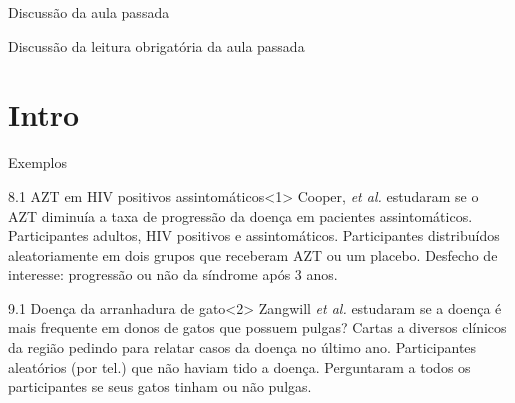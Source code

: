 \documentclass{beamer}
\begin{document}


\begin{frame}{\scriptsize Discussão da aula passada}
  \begin{block}{}
    Discussão da leitura obrigatória da aula passada
  \end{block}
\end{frame}

\section{Intro}

\begin{frame}{\scriptsize Exemplos}
  \begin{exampleblock}{8.1 AZT em HIV positivos assintomáticos}<1>
    \footnotesize
    Cooper, {\em et al.} estudaram se o AZT diminuía a taxa de progressão da doença em pacientes assintomáticos.
    Participantes adultos, HIV positivos e assintomáticos.
    Participantes distribuídos aleatoriamente em dois grupos que receberam AZT ou um placebo.
    Desfecho de interesse: progressão ou não da síndrome após 3 anos.
  \end{exampleblock}
  \begin{exampleblock}{9.1 Doença da arranhadura de gato}<2>
    \footnotesize
    Zangwill {\em et al.} estudaram se a doença é mais frequente em donos de gatos que possuem pulgas?
    Cartas a diversos clínicos da região pedindo para relatar casos da doença no último ano.
    Participantes aleatórios (por tel.) que não haviam tido a doença.
    Perguntaram a todos os participantes se seus gatos tinham ou não pulgas.
  \end{exampleblock}
\end{frame}
\end{document}
